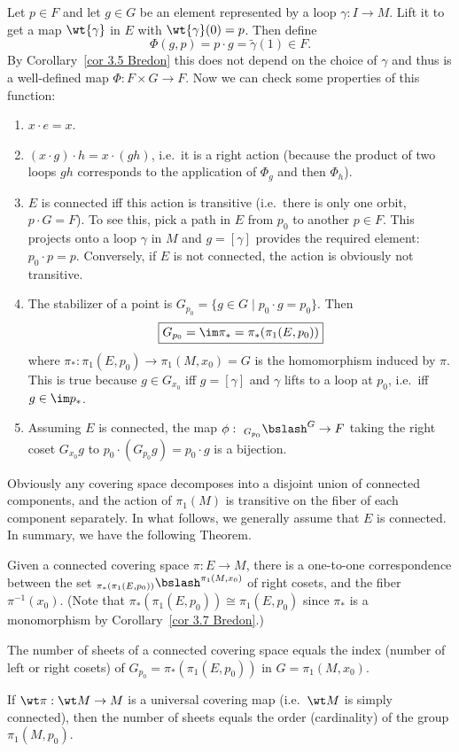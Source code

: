 Let $p\in F$ and let $g\in G$ be an element represented by a loop $\gamma :I\to M$. Lift it to get a map $\wt{\gamma}$ in $E$ with $\wt{\gamma}(0)=p$. Then define
\[\Phi(g,p)=p\cdot g =\tilde{\gamma}(1) \in F.\]
By Corollary~\ref{cor 3.5 Bredon} this does not depend on the choice of $\gamma$ and thus is a well-defined map $\Phi:F\times G\to F$. Now we can check some properties of this function:
\begin{enumerate}
    \item $x\cdot e=x$.
    \item $(x\cdot g)\cdot h=x\cdot (gh)$, i.e.\ it is a right action (because the product of two loops $gh$ corresponds to the application of $\Phi_g$ and then $\Phi_h$).
    \item $E$ is connected iff this action is transitive (i.e.\ there is only one orbit, $p\cdot G=F$). To see this, pick a path in $E$ from $p_0$ to another $p\in F$. This projects onto a loop $\gamma$ in $M$ and $g=[\gamma]$ provides the required element: $p_0\cdot p=p$. Conversely, if $E$ is not connected, the action is obviously not transitive.
    \item The stabilizer of a point is $G_{p_0}=\{g\in G\mid p_0\cdot g=p_0\}$. Then 
    \[
        \boxed{G_{p_0}=\im \pi_\ast=\pi_\ast(\pi_1(E,p_0))}\label{stabilizer}
    \]
    where $\pi_\ast:\pi_1(E,p_0)\to \pi_1(M,x_0)=G$ is the homomorphism induced by $\pi$. This is true because $g\in G_{x_0}$ iff $g=[\gamma]$ and $\gamma$ lifts to a loop at $p_0$, i.e.\ iff $g\in \im p_\ast$.
    \item Assuming $E$ is connected, the map $\phi: \ _{G_{p_0}}\bslash^{G}\to F$ taking the right coset $G_{x_0}g$ to $p_0\cdot (G_{p_0}g)=p_0\cdot g$ is a bijection.
\end{enumerate}
Obviously any covering space decomposes into a disjoint union of connected components, and the action of $\pi_1(M)$ is transitive on the fiber of each component separately. In what follows, we generally assume that $E$ is connected. In summary, we have the following Theorem.
\begin{thm}
    Given a connected covering space $\pi:E\to M$, there is a one-to-one correspondence between the set $_{\pi_\ast(\pi_1(E,p_0))}\bslash^{\pi_1(M,x_0)}$ of right cosets, and the fiber $\pi^{-1}(x_0)$. (Note that $\pi_\ast(\pi_1(E,p_0))\cong \pi_1(E,p_0)$ since $\pi_\ast$ is a monomorphism by Corollary~\ref{cor 3.7 Bredon}.)
\end{thm}
\begin{cor}
    The number of sheets of a connected covering space equals the index (number of left or right cosets) of $G_{p_0}=\pi_\ast(\pi_1(E,p_0))$ in $G=\pi_1(M,x_0)$.
\end{cor}
\begin{cor}
    If $\wt\pi:\wt M\to M$ is a universal covering map (i.e.\ $\wt M$ is simply connected), then the number of sheets equals the order (cardinality) of the group $\pi_1(M,p_0)$.
\end{cor}

